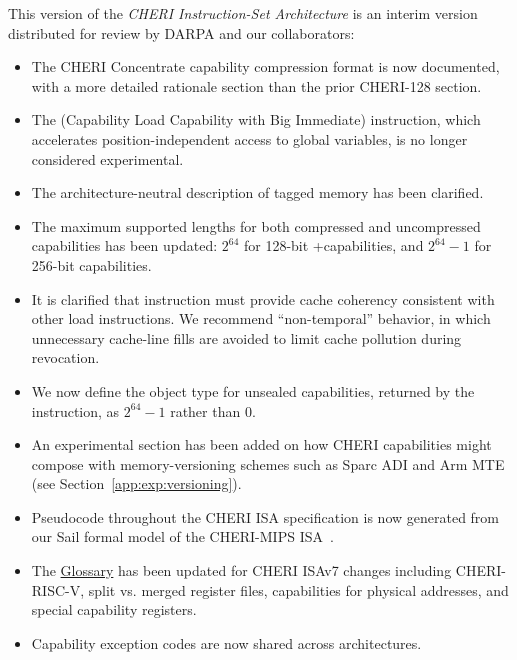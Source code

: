This version of the \textit{CHERI Instruction-Set Architecture} is an interim
version distributed for review by DARPA and our collaborators:

\begin{itemize}

\item The CHERI Concentrate capability compression format is now documented,
  with a more detailed rationale section than the prior CHERI-128 section.

\item The  (Capability Load Capability with Big Immediate)
  instruction, which accelerates position-independent access to global
  variables, is no longer considered experimental.

\item The architecture-neutral description of tagged memory has been
  clarified.

\item The maximum supported lengths for both compressed and uncompressed
  capabilities has been updated: $2^{64}$ for 128-bit +capabilities, and
  $2^{64} - 1$ for 256-bit capabilities.

\item It is clarified that  instruction must provide
  cache coherency consistent with other load instructions.
  We recommend ``non-temporal'' behavior, in which unnecessary cache-line
  fills are avoided to limit cache pollution during revocation.

\item We now define the object type for unsealed capabilities, returned by
  the  instruction, as $2^{64}-1$ rather than $0$.

\item An experimental section has been added on how CHERI capabilities might
  compose with memory-versioning schemes such as Sparc ADI and Arm MTE
  (see Section~\ref{app:exp:versioning}).

\item Pseudocode throughout the CHERI ISA specification is now generated from
  our Sail formal model of the CHERI-MIPS ISA~\cite{sail-popl2019}.

\item The \hyperref[glossary]{Glossary} has been updated for CHERI ISAv7
  changes including CHERI-RISC-V, split vs. merged register files,
  capabilities for physical addresses, and special capability registers.

\item Capability exception codes are now shared across architectures.


\end{itemize}
